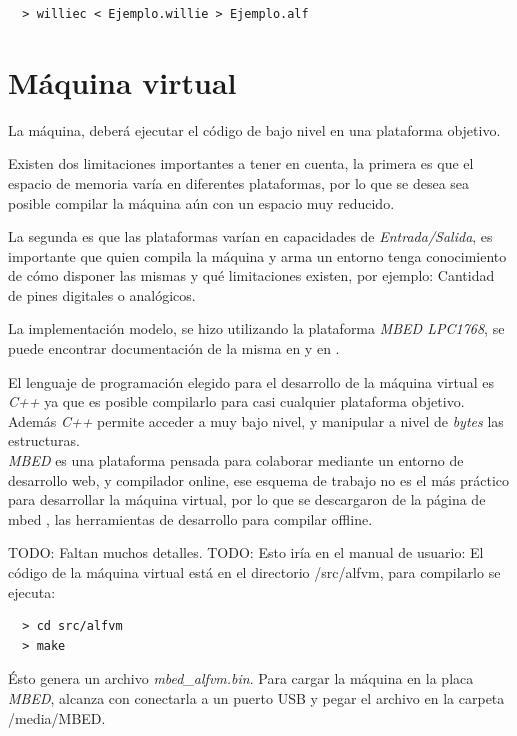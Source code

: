   \begin{verbatim}
  > williec < Ejemplo.willie > Ejemplo.alf
  \end{verbatim}

\section{Máquina virtual}

  La máquina, deberá ejecutar el código de bajo nivel en una plataforma
  objetivo.

  Existen dos limitaciones importantes a tener en cuenta, la primera es que
el espacio de memoria varía en diferentes plataformas, por lo que se desea
sea posible compilar la máquina aún con un espacio muy reducido.

  La segunda es que las plataformas varían en capacidades
de \textit{Entrada/Salida}, es importante que quien compila la máquina y
arma un entorno tenga conocimiento de cómo disponer las mismas y qué
limitaciones existen, por ejemplo: Cantidad de pines digitales o analógicos.

  La implementación modelo, se hizo utilizando
  la plataforma \textit{MBED LPC1768},
se puede encontrar documentación de la misma en \cite{mbed-LPC1768} 
y en \cite{mbed}.

  El lenguaje de programación elegido para el desarrollo de la máquina virtual
es \textit{C++} ya que es posible compilarlo para casi cualquier plataforma
objetivo.
  Además \textit{C++} permite acceder a muy bajo nivel, y manipular a
nivel de \emph{bytes} las estructuras.\\

  \textit{MBED} es una plataforma pensada para colaborar mediante
un entorno de desarrollo web, y compilador online, ese esquema de 
trabajo no es el más práctico para desarrollar la máquina virtual, por
lo que se descargaron de la página de mbed \cite{mbeddev}, las herramientas
de desarrollo para compilar offline.

TODO: Faltan muchos detalles.
TODO: Esto iría en el manual de usuario:
  El código de la máquina virtual está en el directorio
  /src/alfvm, para compilarlo se ejecuta:

\begin{verbatim}
  > cd src/alfvm
  > make
\end{verbatim}

  Ésto genera un archivo \emph{mbed\_alfvm.bin}.
  Para cargar la máquina en la placa \textit{MBED}, alcanza con conectarla
a un puerto USB y pegar el archivo en la carpeta /media/MBED.

